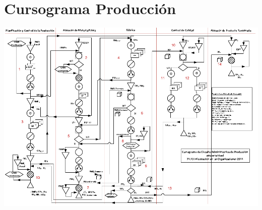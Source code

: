 \section{Cursograma Producci\'on}
\begin{center}
 \includegraphics[angle=90,scale=0.95,keepaspectratio=true]{./Circuitos-Teoricos/Produccion/Images/cursograma-produccion.png}
\end{center}

